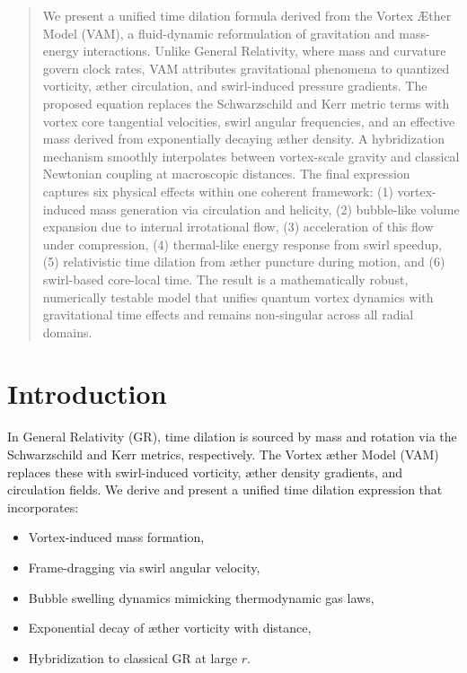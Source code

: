 \documentclass[12pt]{article}
\begin{document}
  \titlepageOpen

\begin{abstract}
We present a unified time dilation formula derived from the Vortex \AE{}ther Model (VAM), a fluid-dynamic reformulation of gravitation and mass-energy interactions. Unlike General Relativity, where mass and curvature govern clock rates, VAM attributes gravitational phenomena to quantized vorticity, æther circulation, and swirl-induced pressure gradients. The proposed equation replaces the Schwarzschild and Kerr metric terms with vortex core tangential velocities, swirl angular frequencies, and an effective mass derived from exponentially decaying æther density. A hybridization mechanism smoothly interpolates between vortex-scale gravity and classical Newtonian coupling at macroscopic distances. The final expression captures six physical effects within one coherent framework: (1) vortex-induced mass generation via circulation and helicity, (2) bubble-like volume expansion due to internal irrotational flow, (3) acceleration of this flow under compression, (4) thermal-like energy response from swirl speedup, (5) relativistic time dilation from æther puncture during motion, and (6) swirl-based core-local time. The result is a mathematically robust, numerically testable model that unifies quantum vortex dynamics with gravitational time effects and remains non-singular across all radial domains.
\end{abstract}

  \titlepageClose
\fi

\section{\papertitle}


\section*{Introduction}
In General Relativity (GR), time dilation is sourced by mass and rotation via the Schwarzschild and Kerr metrics, respectively. The Vortex \ae{}ther Model (VAM) replaces these with swirl-induced vorticity, æther density gradients, and circulation fields. We derive and present a unified time dilation expression that incorporates:

\begin{itemize}
    \item Vortex-induced mass formation,
    \item Frame-dragging via swirl angular velocity,
    \item Bubble swelling dynamics mimicking thermodynamic gas laws,
    \item Exponential decay of æther vorticity with distance,
    \item Hybridization to classical GR at large $r$.
\end{itemize}
\end{document}

